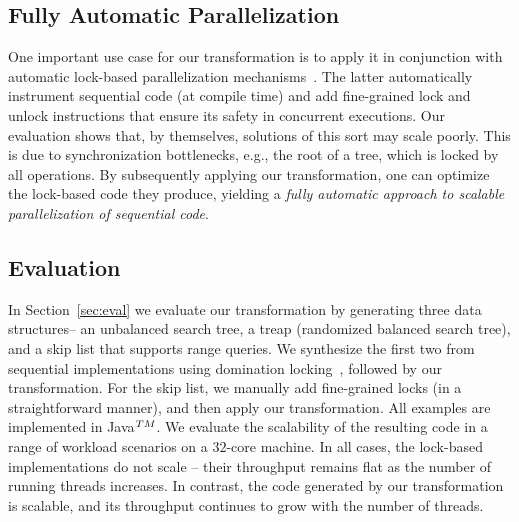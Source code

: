 \subsection{Fully Automatic Parallelization}
One important use case for our transformation is to apply it in conjunction with automatic lock-based
parallelization mechanisms~\cite{Gueta2011,MZGB:POPL06}.
The latter automatically instrument sequential code (at compile time)
and add fine-grained lock and unlock instructions that ensure its safety in concurrent executions.
Our evaluation shows that, by themselves, solutions of this sort may scale poorly.
This is due to synchronization bottlenecks, e.g., the root of a tree,
which is locked by all operations.
By subsequently applying our transformation, one can optimize
the lock-based code they produce, yielding a \emph{fully automatic approach to
scalable parallelization of sequential code}.


\subsection{Evaluation}
In Section~\ref{sec:eval} we evaluate our transformation by generating three data structures-- an unbalanced search tree, a treap
(randomized balanced search tree),
and a skip list that supports range queries. We synthesize the first two from sequential implementations using domination locking~\cite{Gueta2011}, followed by our transformation.
For the skip list, we manually add fine-grained locks (in a straightforward manner), and then apply our transformation.
All examples are implemented in Java$^{\sc TM}$. We evaluate the scalability of the resulting code
in a range of workload scenarios on a $32$-core machine.
In all cases, the lock-based implementations do not scale --
their throughput remains flat as the number of running threads increases. In contrast, the code generated by our transformation
is scalable, and its throughput continues to grow with the number of threads.

